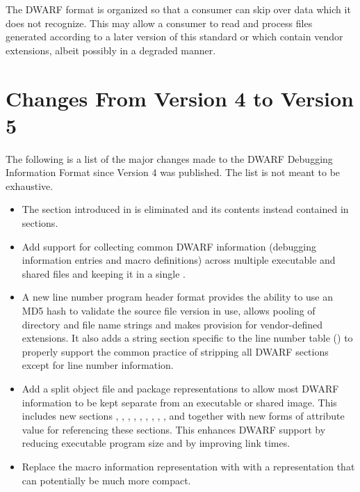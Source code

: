The DWARF format is organized so that a consumer can skip over
data which it does not recognize. This may allow a consumer
to read and process files generated according to a later
version of this standard or which contain vendor extensions,
albeit possibly in a degraded manner.

\section{Changes From Version 4 to Version 5}
The following is a list of the major changes made to the 
DWARF Debugging Information Format since Version 4 was published. 
The list is not meant to be exhaustive.
\begin{itemize}
\item The \dotdebugtypes{}
section introduced in \DWARFVersionIV{} 
is eliminated and its contents instead contained in \dotdebuginfo{} sections.
\item Add support for collecting common DWARF information 
(debugging information entries and macro definitions)
across multiple executable and shared files and keeping it in a single
.
\item A new line number program header format 
provides the ability to use an MD5 hash to validate 
the source file version in use, allows pooling 
of directory and file name strings and makes provision for vendor-defined
extensions. It also adds a string section specific to the line number table 
(\dotdebuglinestr)
to properly support the common practice of stripping all DWARF sections
except for line number information.
\item Add a split object file and package representations to allow most 
DWARF information to be kept separate from an executable 
or shared image. This includes new sections 
\dotdebugaddr, \dotdebugstroffsets, \dotdebugabbrevdwo, \dotdebuginfodwo, 
\dotdebuglinedwo, \dotdebuglocdwo, \dotdebugmacrodwo, \dotdebugstrdwo,
\dotdebugstroffsetsdwo, \dotdebugcuindex{} and \dotdebugtuindex{} 
together with new forms of attribute value for referencing these sections.
This enhances DWARF support by reducing executable program size and
by improving link times.
\item Replace the \dotdebugmacinfo{} macro information representation with
with a \dotdebugmacro{} representation that can potentially be much more compact.


\end{itemize}
